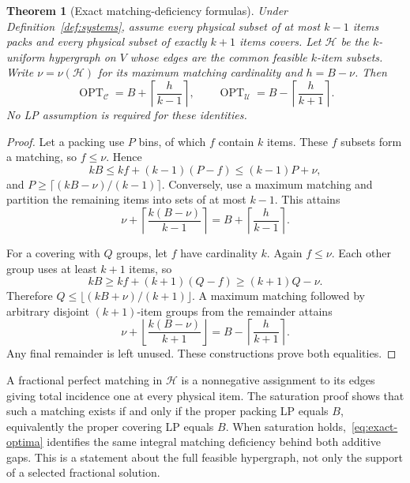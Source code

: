 \documentclass[11pt,a4paper]{article}
\newtheorem{theorem}{Theorem}
\theoremstyle{definition}
\theoremstyle{remark}
\newcommand{\OPT}{\operatorname{OPT}}
\newcommand{\ceil}[1]{\left\lceil #1\right\rceil}
\newcommand{\floor}[1]{\left\lfloor #1\right\rfloor}
\newcommand{\cC}{\mathcal C}
\newcommand{\cU}{\mathcal U}
\newcommand{\cH}{\mathcal H}
\begin{document}
\begin{theorem}[Exact matching-deficiency formulas]\label{thm:matching}
Under Definition~\ref{def:systems}, assume every physical subset of at most $k-1$ items packs and every physical subset of exactly $k+1$ items covers. Let $\cH$ be the $k$-uniform hypergraph on $V$ whose edges are the common feasible $k$-item subsets. Write $\nu=\nu(\cH)$ for its maximum matching cardinality and $h=B-\nu$. Then
\begin{equation}\label{eq:exact-optima}
 \OPT_{\cC}=B+\ceil{\frac h{k-1}},
 \qquad
 \OPT_{\cU}=B-\ceil{\frac h{k+1}}.
\end{equation}
No LP assumption is required for these identities.
\end{theorem}
\begin{proof}
Let a packing use $P$ bins, of which $f$ contain $k$ items. These $f$ subsets form a matching, so $f\le\nu$. Hence
\[
 kB\le kf+(k-1)(P-f)\le(k-1)P+\nu,
\]
and $P\ge\lceil(kB-\nu)/(k-1)\rceil$. Conversely, use a maximum matching and partition the remaining items into sets of at most $k-1$. This attains
\[
 \nu+\ceil{\frac{k(B-\nu)}{k-1}}
 =B+\ceil{\frac h{k-1}}.
\]

For a covering with $Q$ groups, let $f$ have cardinality $k$. Again $f\le\nu$. Each other group uses at least $k+1$ items, so
\[
 kB\ge kf+(k+1)(Q-f)\ge(k+1)Q-\nu.
\]
Therefore $Q\le\lfloor(kB+\nu)/(k+1)\rfloor$. A maximum matching followed by arbitrary disjoint $(k+1)$-item groups from the remainder attains
\[
 \nu+\floor{\frac{k(B-\nu)}{k+1}}
 =B-\ceil{\frac h{k+1}}.
\]
Any final remainder is left unused. These constructions prove both equalities.
\end{proof}

A fractional perfect matching in $\cH$ is a nonnegative assignment to its edges giving total incidence one at every physical item. The saturation proof shows that such a matching exists if and only if the proper packing LP equals $B$, equivalently the proper covering LP equals $B$. When saturation holds,~\eqref{eq:exact-optima} identifies the same integral matching deficiency behind both additive gaps. This is a statement about the full feasible hypergraph, not only the support of a selected fractional solution.
\end{document}

